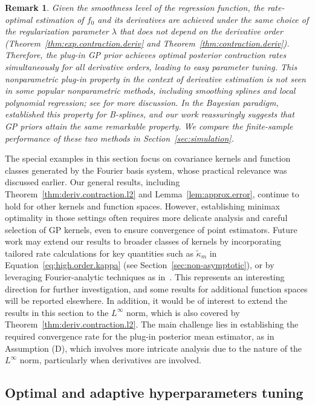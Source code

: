 \documentclass[12pt]{article}
\theoremstyle{plain}
\theoremstyle{nonitalicremark}
\newtheorem*{remark}{Remark}
\begin{document}
\begin{remark}
Given the smoothness level of the regression function, the rate-optimal estimation of $f_0$ and its derivatives are achieved under the same choice of the regularization parameter $\lambda$ that does not depend on the derivative order (Theorem~\ref{thm:exp.contraction.deriv} and Theorem~\ref{thm:contraction.deriv}). Therefore, the plug-in GP prior achieves optimal posterior contraction rates simultaneously for all derivative orders, leading to easy parameter tuning. This nonparametric plug-in property in the context of derivative estimation is not seen in some popular nonparametric methods, including smoothing splines and local polynomial regression; see \cite{liu2020non} for more discussion. In the Bayesian paradigm, \cite{yoo2016supremum} established this property for B-splines, and our work reassuringly suggests that GP priors attain the same remarkable property.
We compare the finite-sample performance of these two methods in Section~\ref{sec:simulation}. 
\end{remark}
The special examples in this section focus on covariance kernels and function classes generated by the Fourier basis system, whose practical relevance was discussed earlier. Our general results, including Theorem~\ref{thm:deriv.contraction.l2} and Lemma~\ref{lem:approx.error}, continue to hold for other kernels and function spaces. However, establishing minimax optimality in those settings often requires more delicate analysis and careful selection of GP kernels, even to ensure convergence of point estimators. Future work may extend our results to broader classes of kernels by incorporating tailored rate calculations for key quantities such as $\tilde{\kappa}_{m}$ in Equation~\ref{eq:high.order.kappa} (see Section~\ref{sec:non-asymptotic}), or by leveraging Fourier-analytic techniques as in~\cite{van2008rates}. This represents an interesting direction for further investigation, and some results for additional function spaces will be reported elsewhere. In addition, it would be of interest to extend the results in this section to the $L^\infty$ norm, which is also covered by Theorem~\ref{thm:deriv.contraction.l2}. The main challenge lies in establishing the required convergence rate for the plug-in posterior mean estimator, as in Assumption (D), which involves more intricate analysis due to the nature of the $L^\infty$ norm, particularly when derivatives are involved.





\subsection{Optimal and adaptive hyperparameters tuning}\label{sec:MMLE}
\end{document}

